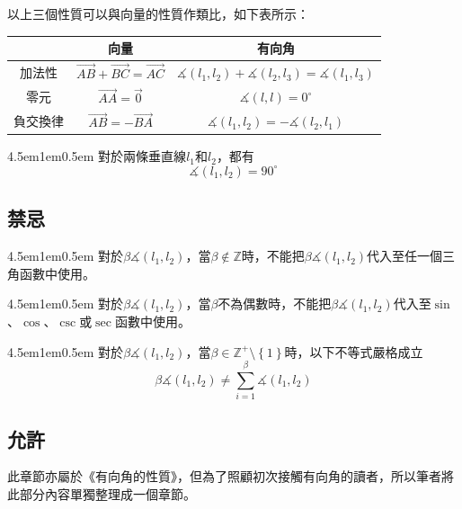 \documentclass[12pt]{article}
\begin{document}
以上三個性質可以與向量的性質作類比，如下表所示：
\begin{table}[H]
    \centering
    \begin{tabular}{|c|c|c|}
        \hline
        &向量&有向角\\
        \hline
        加法性&$\overrightarrow{AB}+\overrightarrow{BC}=\overrightarrow{AC}$
        &$\measuredangle{\left(l_1,l_2\right)}+\measuredangle{\left(l_2,l_3\right)}=\measuredangle{\left(l_1,l_3\right)}$\\
        \hline
        零元&$\overrightarrow{AA}=\overrightarrow{0}$&$\measuredangle{\left(l,l\right)}=0^{\circ}$\\
        \hline
        負交換律&$\overrightarrow{AB}=-\overrightarrow{BA}$&$\measuredangle{\left(l_1,l_2\right)}=-\measuredangle{\left(l_2,l_1\right)}$\\
        \hline
    \end{tabular}
\end{table}
\begin{mybox}[性質4]{4.5em}{1em}{0.5em}
    對於兩條垂直線$l_1$和$l_2$，都有
    $$
        \measuredangle{\left(l_1,l_2\right)}=90^{\circ}
    $$
\end{mybox}
\subsection{禁忌}
\begin{mybox}[禁忌1]{4.5em}{1em}{0.5em}
    對於$\beta\measuredangle{\left(l_1,l_2\right)}$，當$\beta\notin\mathbb{Z}$時，不能把$\beta\measuredangle{\left(l_1,l_2\right)}$代入至任一個三角函數中使用。
\end{mybox}
\begin{mybox}[禁忌2]{4.5em}{1em}{0.5em}
    對於$\beta\measuredangle{\left(l_1,l_2\right)}$，當$\beta$不為偶數時，不能把$\beta\measuredangle{\left(l_1,l_2\right)}$代入至$\sin{}$、$\cos{}$、$\csc{}$或$\sec{}$函數中使用。
\end{mybox}
\begin{mybox}[禁忌3]{4.5em}{1em}{0.5em}
    對於$\beta\measuredangle{\left(l_1,l_2\right)}$，當$\beta\in\mathbb{Z}^+\setminus\left\{1\right\}$時，以下不等式嚴格成立
    $$
        \beta\measuredangle{\left(l_1,l_2\right)}\neq\sum\limits_{i=1}^{\beta}{\measuredangle{\left(l_1,l_2\right)}}
    $$
\end{mybox}
\subsection{允許}
此章節亦屬於《有向角的性質》，但為了照顧初次接觸有向角的讀者，所以筆者將此部分內容單獨整理成一個章節。
\end{document}
